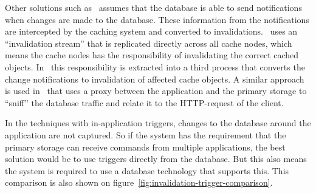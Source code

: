 Other solutions such as~\cite{paper:liskov, paper:ibm, paper:ibm-extended} assumes that the database is able to send notifications when changes are made to the database. These information from the notifications are intercepted by the caching system and converted to invalidations.~\cite{paper:liskov} uses an ``invalidation stream'' that is replicated directly across all cache nodes, which means the cache nodes has the responsibility of invalidating the correct cached objects. In~\cite{paper:ibm, paper:ibm-extended} this responsibility is extracted into a third process that converts the change notifications to invalidation of affected cache objects. A similar approach is used in~\cite{paper:db-driven-http} that uses a proxy between the application and the primary storage to ``sniff'' the database traffic and relate it to the HTTP-request of the client.

In the techniques with in-application triggers, changes to the database around the application are not captured. So if the system has the requirement that the primary storage can receive commands from multiple applications, the best solution would be to use triggers directly from the database. But this also means the system is required to use a database technology that supports this. This comparison is also shown on figure~\ref{fig:invalidation-trigger-comparison}.


